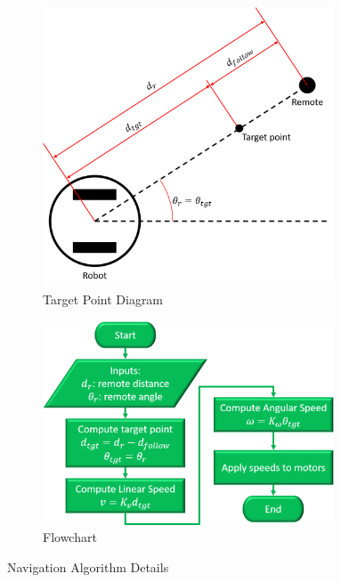 \begin{figure}
    \centering
    \begin{subfigure}{0.45\textwidth}
        \centering
        \includegraphics[width=0.95\textwidth]{figs/img/navAlgoDiagram.png}
        \caption{Target Point Diagram}
        \label{fig:navAlgoDiagram}
    \end{subfigure}%
    \begin{subfigure}{0.55\textwidth}
        \centering
        \includegraphics[width=0.95\textwidth]{figs/img/navigationAlgoFlowchart.png}
        \caption{Flowchart}
        \label{fig:navAlgoFlowchart}
    \end{subfigure}
    \caption{Navigation Algorithm Details}
    \label{fig:navAlgoDetails}
\end{figure}

